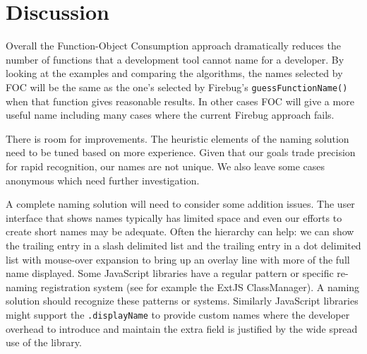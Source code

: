 \documentclass[10pt, preprint]{sigplanconf}
\begin{document}
   

\section{Discussion}
Overall the Function-Object Consumption approach dramatically reduces the number of functions that a development tool cannot name for a developer.  By looking at the examples and comparing the algorithms, the names selected by FOC will be the same as the one's selected by  Firebug's {\small \texttt{guessFunctionName()}} when that function gives reasonable results. In other cases FOC will give a more useful name including many cases where the current Firebug approach fails. 

There is room for improvements. The heuristic elements of the naming solution need to be tuned based on more experience.  Given that our goals trade precision for rapid recognition, our names are not unique. We also leave some cases anonymous which need further investigation. 

A complete naming solution will need to consider some addition issues. The user interface that shows names typically has limited space and even our efforts to create short names may be adequate. Often the hierarchy can help: we can show the trailing entry in a slash delimited list and the trailing entry in a dot delimited list with mouse-over expansion to bring up an overlay line with more of the full name displayed. Some JavaScript libraries have a regular pattern or specific re-naming registration system (see for example the ExtJS ClassManager\cite{ExtJSClassManager}). A naming solution should recognize these patterns or systems. Similarly JavaScript libraries might support the \verb|.displayName| to provide custom names where the developer overhead to introduce and maintain the extra field is justified by the wide spread use of the library.
\end{document}
